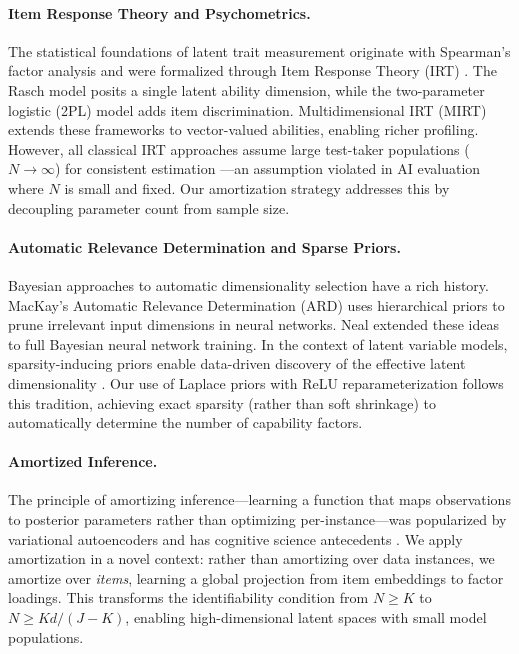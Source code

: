 \documentclass{article}
\theoremstyle{plain}
\theoremstyle{definition}
\theoremstyle{remark}
\begin{document}
\paragraph{Item Response Theory and Psychometrics.}
The statistical foundations of latent trait measurement originate with Spearman's factor analysis \cite{spearman1904proof} and were formalized through Item Response Theory (IRT) \cite{lord1980applications, embretson2000item}. The Rasch model \cite{rasch1960probabilistic} posits a single latent ability dimension, while the two-parameter logistic (2PL) model \cite{birnbaum1968latent} adds item discrimination. Multidimensional IRT (MIRT) \cite{reckase2009multidimensional} extends these frameworks to vector-valued abilities, enabling richer profiling. However, all classical IRT approaches assume large test-taker populations ($N \to \infty$) for consistent estimation \cite{anderson1956statistical}---an assumption violated in AI evaluation where $N$ is small and fixed. Our amortization strategy addresses this by decoupling parameter count from sample size.

\paragraph{Automatic Relevance Determination and Sparse Priors.}
Bayesian approaches to automatic dimensionality selection have a rich history. MacKay's Automatic Relevance Determination (ARD) \cite{mackay1995probable} uses hierarchical priors to prune irrelevant input dimensions in neural networks. Neal \cite{neal1996bayesian} extended these ideas to full Bayesian neural network training. In the context of latent variable models, sparsity-inducing priors enable data-driven discovery of the effective latent dimensionality \cite{tipping1999probabilistic, blei2003latent}. Our use of Laplace priors with ReLU reparameterization follows this tradition, achieving exact sparsity (rather than soft shrinkage) to automatically determine the number of capability factors.

\paragraph{Amortized Inference.}
The principle of amortizing inference---learning a function that maps observations to posterior parameters rather than optimizing per-instance---was popularized by variational autoencoders \cite{kingma2014auto} and has cognitive science antecedents \cite{gershman2014amortized}. We apply amortization in a novel context: rather than amortizing over data instances, we amortize over \textit{items}, learning a global projection from item embeddings to factor loadings. This transforms the identifiability condition from $N \ge K$ to $N \ge Kd/(J-K)$, enabling high-dimensional latent spaces with small model populations.
\end{document}

